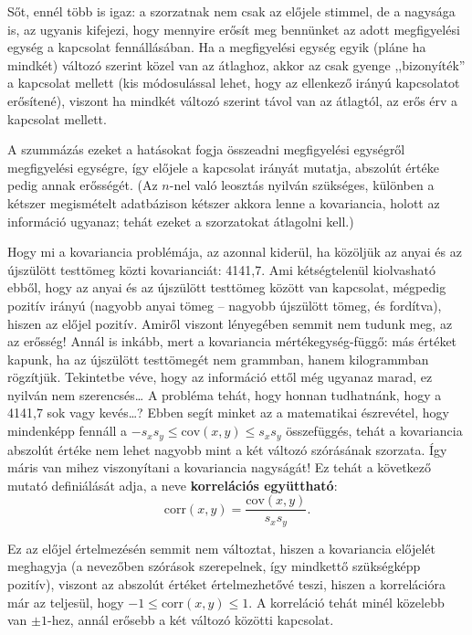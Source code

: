 \documentclass[]{book}
\begin{document}
Sőt, ennél több is igaz: a szorzatnak nem csak az előjele stimmel, de a
nagysága is, az ugyanis kifejezi, hogy mennyire erősít meg bennünket az
adott megfigyelési egység a kapcsolat fennállásában. Ha a megfigyelési
egység egyik (pláne ha mindkét) változó szerint közel van az átlaghoz,
akkor az csak gyenge ,,bizonyíték'' a kapcsolat mellett (kis
módosulással lehet, hogy az ellenkező irányú kapcsolatot erősítené),
viszont ha mindkét változó szerint távol van az átlagtól, az erős érv a
kapcsolat mellett.

A szummázás ezeket a hatásokat fogja összeadni megfigyelési egységről
megfigyelési egységre, így előjele a kapcsolat irányát mutatja, abszolút
értéke pedig annak erősségét. (Az \(n\)-nel való leosztás nyilván
szükséges, különben a kétszer megismételt adatbázison kétszer akkora
lenne a kovariancia, holott az információ ugyanaz; tehát ezeket a
szorzatokat átlagolni kell.)

Hogy mi a kovariancia problémája, az azonnal kiderül, ha közöljük az
anyai és az újszülött testtömeg közti kovarianciát: 4141,7. Ami
kétségtelenül kiolvasható ebből, hogy az anyai és az újszülött testtömeg
között van kapcsolat, mégpedig pozitív irányú (nagyobb anyai tömeg --
nagyobb újszülött tömeg, és fordítva), hiszen az előjel pozitív. Amiről
viszont lényegében semmit nem tudunk meg, az az erősség! Annál is
inkább, mert a kovariancia mértékegység-függő: más értéket kapunk, ha az
újszülött testtömegét nem grammban, hanem kilogrammban rögzítjük.
Tekintetbe véve, hogy az információ ettől még ugyanaz marad, ez nyilván
nem szerencsés\dots{} A probléma tehát, hogy honnan tudhatnánk, hogy a
4141,7 sok vagy kevés\dots{}? Ebben segít minket az a matematikai
észrevétel, hogy mindenképp fennáll a
\(-s_x s_y \leq \mathrm{cov}\left(x,y\right) \leq s_x s_y\) összefüggés,
tehát a kovariancia abszolút értéke nem lehet nagyobb mint a két változó
szórásának szorzata. Így máris van mihez viszonyítani a kovariancia
nagyságát! Ez tehát a következő mutató definiálását adja, a neve
\textbf{korrelációs együttható}: \[
    \mathrm{corr}\left(x,y\right)=\frac{\mathrm{cov}\left(x,y\right)}{s_x s_y}.
\]

Ez az előjel értelmezésén semmit nem változtat, hiszen a kovariancia
előjelét meghagyja (a nevezőben szórások szerepelnek, így mindkettő
szükségképp pozitív), viszont az abszolút értéket értelmezhetővé teszi,
hiszen a korrelációra már az teljesül, hogy
\(-1 \leq \mathrm{corr}\left(x,y\right) \leq 1\). A korreláció tehát
minél közelebb van \(\pm 1\)-hez, annál erősebb a két változó közötti
kapcsolat.
\end{document}
